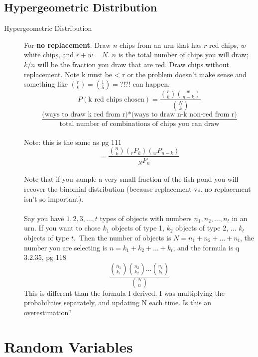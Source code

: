 \subsection{Hypergeometric Distribution}
	\begin{description}
		\item[Hypergeometric Distribution]  For \textbf{no replacement}.  Draw $n$ chips from an urn that has $r$ red chips, $w$ white chips, and $r + w = N$.   $n$ is the total number of chips you will draw; $k/n$ will be the fraction you draw that are red. Draw chips without replacement.  Note k must be < r or the problem doesn't make sense and something like ${{r} \choose {k}} = {{1} \choose {5}} = ?!?!$ can happen.  
			\[ P(\mbox{k red chips chosen}) = \frac{ {{r} \choose {k}} {{w} \choose {n-k}} }{{{N}\choose{k}}} \] %
			\[ \frac{\mbox{(ways to draw \ k red from r)}*\mbox{(ways to draw n-k non-red from r)}}{\mbox{total number of combinations of chips you can draw}} \] \hfill \\
		Note: this is the same as	{\tiny pg 111}
		\[ = \frac{ {{n} \choose {k}} ({{_r}P_{k}}) ({{_w}P_{n-k}}) }{{{_N}P_n}} \] 
			\hfill \\
		Note that if you sample a very small fraction of the fish pond you will recover the binomial distribution (because replacement vs. no replacement isn't so important). \hfill \\
		\hfill \\
		Say you have $1, 2, 3, \dots, t$ types of objects with numbers $n_1, n_2, \dots, n_t$ in an urn.
		If you want to chose $k_1$ objects of  type 1, $k_2$ objects of  type 2, $\dots$ $k_t$ objects of  type $t$.\
		Then the number of objects is $N = n_1 + n_2 + \dots + n_t$, the number you are selecting is $n = k_1+ k_2 + \dots + k_t$, and  the formula is   {\tiny q 3.2.35, pg 118}
		\[  \frac{ {{n_1}\choose{k_1}} {{n_2}\choose{k_2}} \dots {{n_t}\choose{k_t}} }{ {{N}\choose{n}} }  \]
		This is different than the formula I derived.  I was multiplying the probabilities separately, and updating N each time.  Is this an overestimation? 		
	\end{description}
	
\section{Random Variables} 
